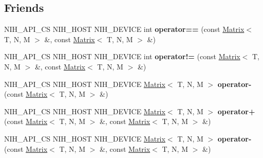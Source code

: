 \subsection*{\-Friends}
\begin{DoxyCompactItemize}
\item 
\hypertarget{structnih_1_1_matrix_aa4d859c0fbdb4cf65243ef2761b7aeb7}{
\-N\-I\-H\-\_\-\-A\-P\-I\-\_\-\-C\-S \-N\-I\-H\-\_\-\-H\-O\-S\-T \-N\-I\-H\-\_\-\-D\-E\-V\-I\-C\-E int {\bfseries operator==} (const \hyperlink{structnih_1_1_matrix}{\-Matrix}$<$ \-T, \-N, \-M $>$ \&, const \hyperlink{structnih_1_1_matrix}{\-Matrix}$<$ \-T, \-N, \-M $>$ \&)}
\label{structnih_1_1_matrix_aa4d859c0fbdb4cf65243ef2761b7aeb7}

\item 
\hypertarget{structnih_1_1_matrix_a443999af1925e0d0e44f8441c73ff2cc}{
\-N\-I\-H\-\_\-\-A\-P\-I\-\_\-\-C\-S \-N\-I\-H\-\_\-\-H\-O\-S\-T \-N\-I\-H\-\_\-\-D\-E\-V\-I\-C\-E int {\bfseries operator!=} (const \hyperlink{structnih_1_1_matrix}{\-Matrix}$<$ \-T, \-N, \-M $>$ \&, const \hyperlink{structnih_1_1_matrix}{\-Matrix}$<$ \-T, \-N, \-M $>$ \&)}
\label{structnih_1_1_matrix_a443999af1925e0d0e44f8441c73ff2cc}

\item 
\hypertarget{structnih_1_1_matrix_a5c7fa91653401bed75a2c3b0b1678c18}{
\-N\-I\-H\-\_\-\-A\-P\-I\-\_\-\-C\-S \-N\-I\-H\-\_\-\-H\-O\-S\-T \-N\-I\-H\-\_\-\-D\-E\-V\-I\-C\-E \*
\hyperlink{structnih_1_1_matrix}{\-Matrix}$<$ \-T, \-N, \-M $>$ {\bfseries operator-\/} (const \hyperlink{structnih_1_1_matrix}{\-Matrix}$<$ \-T, \-N, \-M $>$ \&)}
\label{structnih_1_1_matrix_a5c7fa91653401bed75a2c3b0b1678c18}

\item 
\hypertarget{structnih_1_1_matrix_aa7b9b7b0244fcc9a64f4f4bb45a20aca}{
\-N\-I\-H\-\_\-\-A\-P\-I\-\_\-\-C\-S \-N\-I\-H\-\_\-\-H\-O\-S\-T \-N\-I\-H\-\_\-\-D\-E\-V\-I\-C\-E \*
\hyperlink{structnih_1_1_matrix}{\-Matrix}$<$ \-T, \-N, \-M $>$ {\bfseries operator+} (const \hyperlink{structnih_1_1_matrix}{\-Matrix}$<$ \-T, \-N, \-M $>$ \&, const \hyperlink{structnih_1_1_matrix}{\-Matrix}$<$ \-T, \-N, \-M $>$ \&)}
\label{structnih_1_1_matrix_aa7b9b7b0244fcc9a64f4f4bb45a20aca}

\item 
\hypertarget{structnih_1_1_matrix_a1ea26a7b60552c90fe0b1a70483a8a0b}{
\-N\-I\-H\-\_\-\-A\-P\-I\-\_\-\-C\-S \-N\-I\-H\-\_\-\-H\-O\-S\-T \-N\-I\-H\-\_\-\-D\-E\-V\-I\-C\-E \*
\hyperlink{structnih_1_1_matrix}{\-Matrix}$<$ \-T, \-N, \-M $>$ {\bfseries operator-\/} (const \hyperlink{structnih_1_1_matrix}{\-Matrix}$<$ \-T, \-N, \-M $>$ \&, const \hyperlink{structnih_1_1_matrix}{\-Matrix}$<$ \-T, \-N, \-M $>$ \&)}
\label{structnih_1_1_matrix_a1ea26a7b60552c90fe0b1a70483a8a0b}


\end{DoxyCompactItemize}
